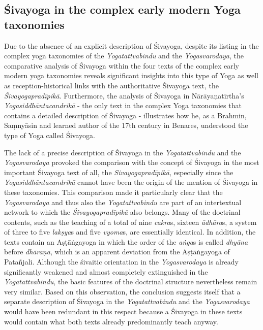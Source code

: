\subsection{Śivayoga in the complex early modern Yoga taxonomies}

Due to the absence of an explicit description of Śivayoga, despite its listing in the complex yoga taxonomies of the \emph{Yogatattvabindu} and the \emph{Yogasvarodaya}, the comparative analysis of Śivayoga within the four texts of the complex early modern yoga taxonomies reveals significant insights into this type of Yoga as well as reception-historical links with the authoritative Śivayoga text, the \emph{Śivayogapradīpikā}. Furthermore, the analysis of Śivayoga in Nārāyaṇatīrtha's \emph{Yogasiddhāntacandrikā} - the only text in the complex Yoga taxonomies that contains a detailed description of Śivayoga - illustrates how he, as a Brahmin, Saṃnyāsin and learned author of the 17th century in Benares, understood the type of Yoga called Śivayoga.

The lack of a precise description of Śivayoga in the \emph{Yogatattvabindu} and the \emph{Yogasvarodaya} provoked the comparison with the concept of Śivayoga in the most important Śivayoga text of all, the \emph{Sivayogapradīpikā}, especially since the \emph{Yogasiddhāntacandrikā} cannot have been the origin of the mention of Śivayoga in these taxonomies. This comparison made it particularly clear that the \emph{Yogasvarodaya} and thus also the \emph{Yogatattvabindu} are part of an intertextual network to which the \emph{Śivayogapradīpikā} also belongs. Many of the doctrinal contents, such as the teaching of a total of nine \emph{cakra}s, sixteen \emph{ādhāra}s, a system of three to five \textit{lakṣya}s and five \emph{vyoma}s, are essentially identical. In addition, the texts contain an Aṣṭāṅgayoga in which the order of the \textit{aṅga}s is called \textit{dhyāna} before \textit{dhāraṇa}, which is an apparent deviation from the Aṣṭāṅgayoga of Patañjali. Although the śivaitic orientation in the \emph{Yogasvarodaya} is already significantly weakened and almost completely extinguished in the \emph{Yogatattvabindu}, the basic features of the doctrinal structure nevertheless remain very similar. Based on this observation, the conclusion suggests itself that a separate description of Śivayoga in the \emph{Yogatattvabindu} and the \emph{Yogasvarodaya} would have been redundant in this respect because a Śivayoga in these texts would contain what both texts already predominantly teach anyway.

